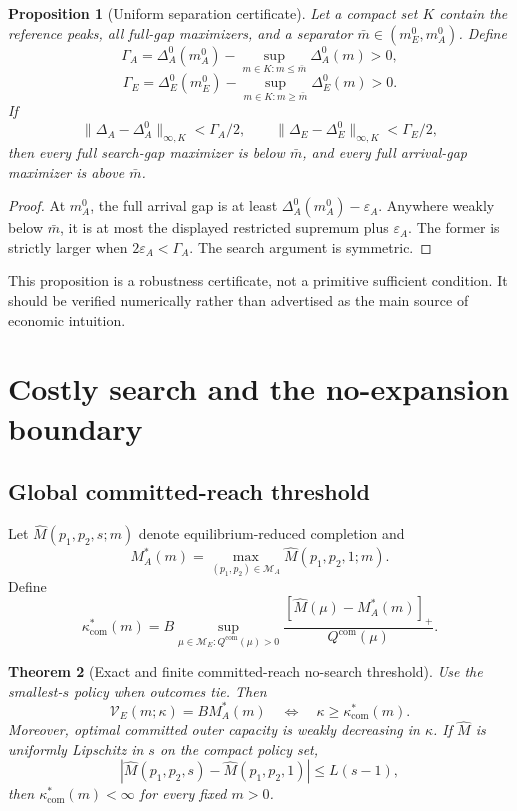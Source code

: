 \documentclass[11pt]{article}
\newtheorem{theorem}{Theorem}
\newtheorem{proposition}[theorem]{Proposition}
\theoremstyle{definition}
\theoremstyle{remark}
\newcommand{\cM}{\mathcal M}
\newcommand{\com}{\mathrm{com}}
\begin{document}
\begin{proposition}[Uniform separation certificate]
Let a compact set $K$ contain the reference peaks, all full-gap maximizers,
and a separator $\bar m\in(m_E^0,m_A^0)$.  Define
\[
\Gamma_A=\Delta_A^0(m_A^0)-
\sup_{m\in K:m\le\bar m}\Delta_A^0(m)>0,
\]
\[
\Gamma_E=\Delta_E^0(m_E^0)-
\sup_{m\in K:m\ge\bar m}\Delta_E^0(m)>0.
\]
If
\[
\|\Delta_A-\Delta_A^0\|_{\infty,K}<\Gamma_A/2,
\qquad
\|\Delta_E-\Delta_E^0\|_{\infty,K}<\Gamma_E/2,
\]
then every full search-gap maximizer is below $\bar m$, and every full
arrival-gap maximizer is above $\bar m$.
\end{proposition}

\begin{proof}
At $m_A^0$, the full arrival gap is at least
$\Delta_A^0(m_A^0)-\varepsilon_A$.  Anywhere weakly below $\bar m$, it is at
most the displayed restricted supremum plus $\varepsilon_A$.  The former is
strictly larger when $2\varepsilon_A<\Gamma_A$.  The search argument is
symmetric.
\end{proof}

This proposition is a robustness certificate, not a primitive sufficient
condition.  It should be verified numerically rather than advertised as the
main source of economic intuition.

\section{Costly search and the no-expansion boundary}

\subsection{Global committed-reach threshold}

Let $\widehat M(p_1,p_2,s;m)$ denote equilibrium-reduced completion and
\[
M_A^*(m)=\max_{(p_1,p_2)\in\cM_A}
\widehat M(p_1,p_2,1;m).
\]
Define
\begin{equation}
\kappa_{\com}^*(m)
=B\sup_{\mu\in\cM_E:Q^{\com}(\mu)>0}
\frac{[\widehat M(\mu)-M_A^*(m)]_+}{Q^{\com}(\mu)}.
\label{eq:kappastar}
\end{equation}

\begin{theorem}[Exact and finite committed-reach no-search threshold]
\label{thm:kappa}
Use the smallest-$s$ policy when outcomes tie.  Then
\[
\mathcal V_E(m;\kappa)=BM_A^*(m)
\quad\Longleftrightarrow\quad
\kappa\ge\kappa_{\com}^*(m).
\]
Moreover, optimal committed outer capacity is weakly decreasing in $\kappa$.
If $\widehat M$ is uniformly Lipschitz in $s$ on the compact policy set,
\[
|\widehat M(p_1,p_2,s)-\widehat M(p_1,p_2,1)|\le L(s-1),
\]
then $\kappa_{\com}^*(m)<\infty$ for every fixed $m>0$.
\end{theorem}
\end{document}
